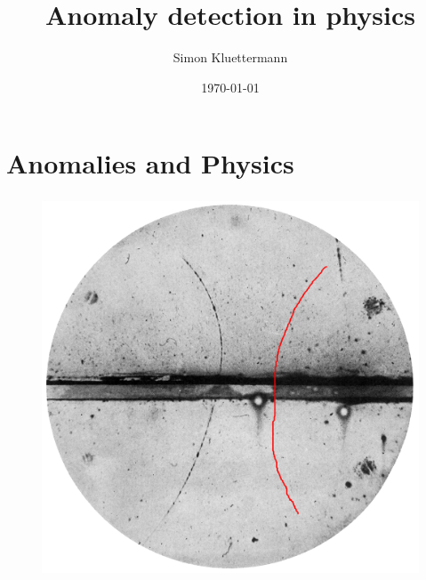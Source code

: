 \documentclass[hyperref={pdfpagelabels=false}]{beamer}
\title[Simon Kl{\"u}ttermann]{Anomaly detection in physics}
\author{Simon Kluettermann}
\date{\today}
\begin{document}
\begin{frame}[label=]
\frametitle{}
\titlepage
\end{frame}



\newpage
\section{Anomalies and Physics}\label{sec:Anomalies and Physics}


\begin{frame}[label=]
\frametitle{}
\begin{figure}[H] 
  \centering
\includegraphics[height=0.9\textheight]{../imgs/positron2.png}
\label{fig:positron2png}
  \end{figure}


\end{frame}
\end{document}
